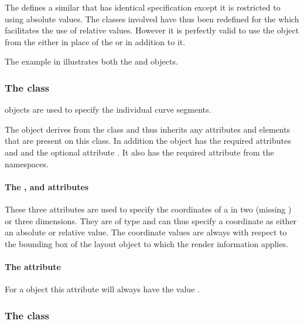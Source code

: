 The \LayoutPackage defines a similar  that has identical specification except it is restricted to using absolute values.  The classes involved have thus been redefined for the \RenderPackage which facilitates the use of relative values. However it is perfectly valid to use the  object from the \LayoutPackage either in place of the \ListOfElements or in addition to it. 

The example in  illustrates both the \ListOfElements and  objects.

\subsubsection{The  class}
\label{renderpoint-class}

\RenderPoint objects are used to 
specify the individual curve segments.

The \RenderPoint object derives from the \SBase class and thus inherits
any attributes and elements that are present on this class.
In addition the \RenderPoint object has the required attributes  and  and the optional attribute . It also has the required attribute  from the  namespaces.

\paragraph{The \fixttspace{}, \fixttspace{} and \fixttspace{} attributes}

These three attributes are used to specify the coordinates of a  \RenderPoint in two (missing ) or three dimensions. They are of type \RelAbsVector and can thus specify a coordinate as either an absolute or relative value. The coordinate
values are always with respect to the bounding box of the layout object to which the
render information applies.

\paragraph{The \fixttspace{} attribute}

For a \RenderPoint object this attribute will always have the value .


\subsubsection{The  class}
\label{rendercubicbezier-class}



